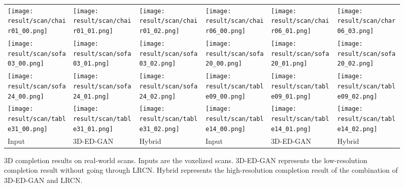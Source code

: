 \documentclass[10pt,twocolumn,letterpaper]{article}
\begin{document}
\begin{figure}[tb]
\centering

    \setlength{\tabcolsep}{0.1em}
\renewcommand{\arraystretch}{0} %
    \begin{tabular}{CCC|CCC}
\texttt{[image: result/scan/chair01\_00.png]}
&\texttt{[image: result/scan/chair01\_01.png]}
&\texttt{[image: result/scan/chair01\_02.png]}
&\texttt{[image: result/scan/chair06\_00.png]}
&\texttt{[image: result/scan/chair06\_01.png]}
&\texttt{[image: result/scan/char06\_03.png]}
\\
\texttt{[image: result/scan/sofa03\_00.png]}
&\texttt{[image: result/scan/sofa03\_01.png]}
&\texttt{[image: result/scan/sofa03\_02.png]}
&\texttt{[image: result/scan/sofa20\_00.png]}
&\texttt{[image: result/scan/sofa20\_01.png]}
&\texttt{[image: result/scan/sofa20\_02.png]}
\\
\texttt{[image: result/scan/sofa24\_00.png]}
&\texttt{[image: result/scan/sofa24\_01.png]}
&\texttt{[image: result/scan/sofa24\_02.png]}
&\texttt{[image: result/scan/table09\_00.png]}
&\texttt{[image: result/scan/table09\_01.png]}
&\texttt{[image: result/scan/table09\_02.png]}
\\
\texttt{[image: result/scan/table31\_00.png]}

&\texttt{[image: result/scan/table31\_01.png]}

&\texttt{[image: result/scan/table31\_02.png]}

&\texttt{[image: result/scan/table14\_00.png]}

&\texttt{[image: result/scan/table14\_01.png]}

&\texttt{[image: result/scan/table14\_02.png]}

\\

\scriptsize Input & \scriptsize 3D-ED-GAN & \scriptsize Hybrid&

\scriptsize Input & \scriptsize 3D-ED-GAN & \scriptsize Hybrid
    \end{tabular}
    \caption{3D completion results on real-world scans. Inputs are the voxelized scans. 3D-ED-GAN represents the low-resolution completion result without going through LRCN. Hybrid represents the high-resolution completion result of the combination of 3D-ED-GAN and LRCN.}
\label{fig:realdata}
\end{figure}
\end{document}
